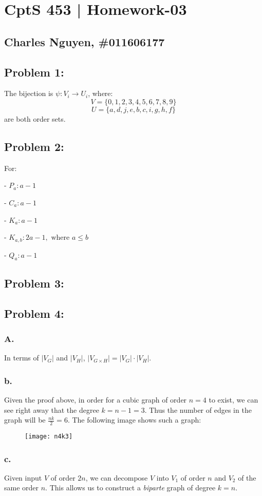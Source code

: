 \documentclass[12pt,letterpaper]{article}
\begin{document}
\section*{CptS 453 | Homework-03 }
\subsection*{Charles Nguyen, \#011606177 }

\subsection*{Problem 1:}


The bijection is $\psi: V_i \rightarrow U_i $, where:
\[ V = \{0,1,2,3,4,5,6,7,8,9\} \]
\[ U = \{a,d,j,e,b,c,i,g,h,f\} \]
are both order sets.

\subsection*{Problem 2:}

For:

- $P_a: a - 1$

- $C_a: a - 1$

- $K_a: a - 1$

- $K_{a,b}: 2a - 1, \mbox{ where } a \leq b$

- $Q_a: a - 1$

\subsection*{Problem 3:}


\pagebreak
\subsection*{Problem 4:}

\subsubsection*{A.}

In terms of $|V_G|$ and $|V_H|$, $|V_{G {\times} H}| = |V_G| \cdot |V_H|$.

\subsubsection*{b.}
Given the proof above, in order for a cubic graph of order $n=4$ to exist, we
can see right away that the degree $k=n-1=3$. Thus the number of edges in the
graph will be $\frac{nk}{2} = 6$. The following image shows such a graph:

\begin{figure}[h]
\texttt{[image: n4k3]}
\centering
\end{figure}

\subsubsection*{c.}
Given input $V$ of order $2n$, we can decompose $V$ into $V_1$ of order $n$
and $V_2$ of the same order $n$.  This allows us to construct a \emph{biparte} graph of degree $k=n$.
\end{document}

